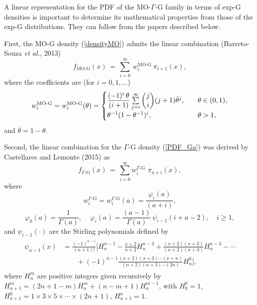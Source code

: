 \documentclass[12pt,a4paper]{article} %
\begin{document}
A linear representation for the PDF of the MO-$\Gamma$-G family in terms of exp-G densities is important
to determine its mathematical properties from those of the exp-G distributions. They can follow from the papers
described below.

First, the MO-G density (\ref{densityMO}) admits the
linear combination  (Barreto-Souza \emph{et al.}, 2013)
\begin{equation*}
f_{\text{MO-G}}(x)
\,=\,
\sum^{\infty}_{i=0}\,w_i^{\text{MO-G}}\,\pi_{i+1}(x),
\label{EXP44}
\end{equation*}
where the coefficients are (for $i=0,1,\ldots$)
\[
w_i^{\text{MO-G}}=w_i^{\text{MO-G}}(\theta) =
\begin{cases}
\dfrac{(-1)^i\,\theta}{(i+1)} \sum\limits^{\infty}_{j=i}\dbinom{j}{i}(j+1) \bar{\theta}^j,& \quad \theta\in (0,1),\\
\theta^{-1} (1-\theta^{-1})^i,& \quad \theta>1,
\end{cases}
\]
and $\bar{\theta}=1-\theta$.


Second, the linear combination for the $\Gamma\text{-G}$ density (\ref{PDF_Ga}) was
derived by Castellares and Lemonte (2015) as
\begin{equation*}\label{EXP33}
f_{\Gamma\text{-G}}(x)\,=\,\sum_{i=0}^\infty w_i^{\Gamma\text{-G}}\,\,\pi_{a+i}(x),
\end{equation*}
where
$$w_i^{\Gamma\text{-G}}=w_i^{\Gamma\text{-G}}(a)=\frac{\varphi_{i}(a)}{(a+i)},$$
\begin{equation*}\label{coeficientes}
\varphi_0(a)=\frac{1}{\Gamma(a)},
\quad\,
\varphi_i(a)=\frac{(a-1)}{\Gamma(a)}\,\psi_{i-1}(i+a-2),\quad i\geq 1,
\end{equation*}
and
$\psi_{i-1}(\cdot)$ are the {\color{green}Stirling polynomials} defined by
\begin{align*}\label{polinomios_ward}
\begin{split}
\psi_{n-1}(x)&=\frac{(-1)^{n-1}}{(n+1)!}\Biggl[H^{n-1}_{n}-\frac{x+2}{n+2}H^{n-2}_{n}
+ \frac{(x+2)(x+3)}{(n+2)(n+3)}H^{n-3}_{n}- \cdots\\
&\qquad+ (-1)^{n-1}\frac{(x+2)(x+3)\cdots(x+n)}{(n+2)(n+3)\cdots(2n)}H^{0}_{n}\Biggr],
\end{split}
\end{align*}
where $H^{m}_{n}$ are positive integers given recursively by
$H^{m}_{n+1}=(2n+1-m)H^{m}_{n} + (n-m+1)H^{m-1}_{n}$, with
$H^0_0=1$, $H^{0}_{n+1}=1\times 3\times 5\times\cdots\times(2n+1)$, $H^{n}_{n+1}=1$.
\end{document}
